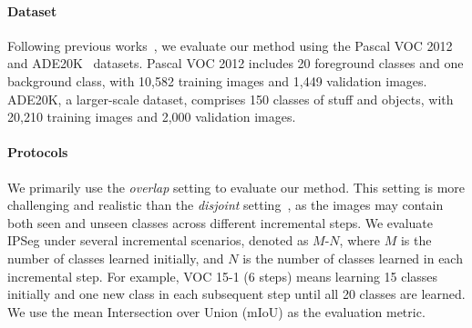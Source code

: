 \paragraph{Dataset} 
Following previous works~\citep{coinseg_zhang2023coinseg,SSUL_cha2021ssul}, we evaluate our method using the Pascal VOC 2012~\citep{voc} and ADE20K~\citep{ade20k} datasets. Pascal VOC 2012 includes 20 foreground classes and one background class, with 10,582 training images and 1,449 validation images. ADE20K, a larger-scale dataset, comprises 150 classes of stuff and objects, with 20,210 training images and 2,000 validation images.











\paragraph{Protocols} 
We primarily use the \textit{overlap} setting to evaluate our method. This setting is more challenging and realistic than the \textit{disjoint} setting~\citep{sats_qiu2023sats}, as the images may contain both seen and unseen classes across different incremental steps. We evaluate IPSeg under several incremental scenarios, denoted as $M$-$N$, where $M$ is the number of classes learned initially, and $N$ is the number of classes learned in each incremental step. For example, VOC 15-1 (6 steps) means learning 15 classes initially and one new class in each subsequent step until all 20 classes are learned. We use the mean Intersection over Union (mIoU) as the evaluation metric.

